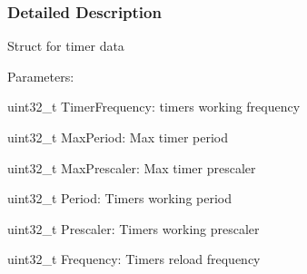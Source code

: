 \subsubsection{Detailed Description}
Struct for timer data

Parameters\+:
\begin{DoxyItemize}
\item uint32\+\_\+t Timer\+Frequency\+: timer\textquotesingle{}s working frequency
\item uint32\+\_\+t Max\+Period\+: Max timer period
\item uint32\+\_\+t Max\+Prescaler\+: Max timer prescaler
\item uint32\+\_\+t Period\+: Timer\textquotesingle{}s working period
\item uint32\+\_\+t Prescaler\+: Timer\textquotesingle{}s working prescaler
\item uint32\+\_\+t Frequency\+: Timer\textquotesingle{}s reload frequency 
\end{DoxyItemize}